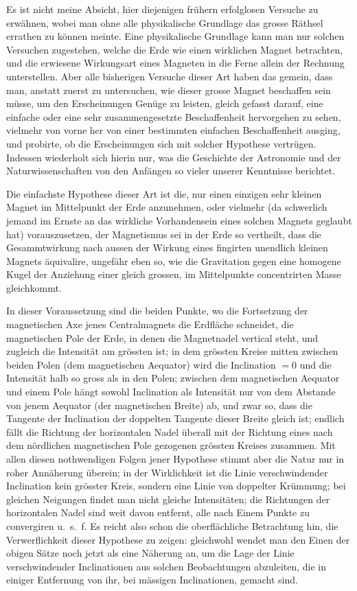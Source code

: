 \documentclass[fontsize=11pt,paper=a4,twoside,openany]{scrbook}
\begin{document}
Es ist nicht meine Absicht, hier diejenigen frühern erfolglosen Versuche zu erwähnen, wobei man ohne alle physikalische Grundlage das grosse Räthsel errathen zu können meinte. Eine physikalische Grundlage kann man nur solchen Versuchen zugestehen, welche die Erde wie einen wirklichen Magnet betrachten, und die erwiesene Wirkungsart eines Magneten in die Ferne allein der Rechnung unterstellen. Aber alle bisherigen Versuche dieser Art haben das gemein, dass man, anstatt zuerst zu untersuchen, wie dieser grosse Magnet beschaffen sein müsse, um den Erscheinungen Genüge zu leisten, gleich gefasst darauf, eine einfache oder eine sehr zusammengesetzte Beschaffenheit hervorgehen zu sehen, vielmehr von vorne her von einer bestimmten einfachen Beschaffenheit ausging, und probirte, ob die Erscheinungen sich mit solcher Hypothese vertrügen. Indessen wiederholt sich hierin nur, was die Geschichte der Astronomie und der Naturwissenschaften von den Anfängen so vieler unserer Kenntnisse berichtet.

Die einfachste Hypothese dieser Art ist die, nur einen einzigen sehr kleinen Magnet im Mittelpunkt der Erde anzunehmen, oder vielmehr (da schwerlich jemand im Ernste an das wirkliche Vorhandensein eines solchen Magnets geglaubt hat) vorauszusetzen, der Magnetismus sei in der Erde so vertheilt, dass die Gesammtwirkung nach aussen der Wirkung eines fingirten unendlich kleinen Magnets äquivalire, ungefähr eben so, wie die Gravitation gegen eine homogene Kugel der Anziehung einer gleich grossen, im Mittelpunkte concentrirten Masse gleichkommt.

In dieser Voraussetzung sind die beiden Punkte, wo die Fortsetzung der magnetischen Axe jenes Centralmagnets die Erdfläche schneidet, die magnetischen Pole der Erde, in denen die Magnetnadel vertical steht, und zugleich die Intensität am grössten ist; in dem grössten Kreise mitten zwischen beiden Polen (dem magnetischen Aequator) wird die Inclination $=0$ und die Intensität halb so gross als in den Polen; zwischen dem magnetischen Aequator und einem Pole hängt sowohl Inclination als Intensität nur von dem Abstande von jenem Aequator (der magnetischen Breite) ab, und zwar so, dass die Tangente der Inclination der doppelten Tangente dieser Breite gleich ist; endlich fällt die Richtung der horizontalen Nadel überall mit der Richtung eines nach dem nördlichen magnetischen Pole gezogenen grössten Kreises zusammen. Mit allen diesen nothwendigen Folgen jener Hypothese stimmt aber die Natur nur in roher Annäherung überein; in der Wirklichkeit ist die Linie verschwindender Inclination kein grösster Kreis, sondern eine Linie von doppelter Krümmung; bei gleichen Neigungen findet man nicht gleiche Intensitäten; die Richtungen der horizontalen Nadel sind weit davon entfernt, alle nach Einem Punkte zu convergiren u.~s.~f. Es reicht also schon die oberflächliche Betrachtung hin, die Verwerflichkeit dieser Hypothese zu zeigen: gleichwohl wendet man den Einen der obigen Sätze noch jetzt als eine Näherung an, um die Lage der Linie verschwindender Inclinationen aus solchen Beobachtungen abzuleiten, die in einiger Entfernung von ihr, bei mässigen Inclinationen, gemacht sind.
\end{document}
